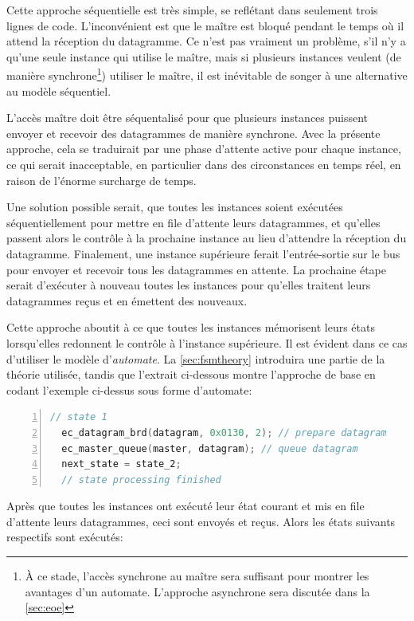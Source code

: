 \documentclass[a4paper,12pt,BCOR6mm,bibtotoc,idxtotoc]{scrbook}
\begin{document}
Cette approche s\'equentielle est tr\`es simple, se refl\'etant dans
seulement trois lignes de code.  L'inconv\'enient est que le ma\^itre
est bloqu\'e pendant le temps o\`u il attend la r\'eception du
datagramme.  Ce n'est pas vraiment un probl\`eme, s'il n'y a qu'une
seule instance qui utilise le ma\^itre, mais si plusieurs instances
veulent (de mani\`ere synchrone\footnote{ \`A ce stade, l'acc\`es
  synchrone au ma\^itre sera suffisant pour montrer les avantages
  d'un automate. L'approche asynchrone sera discut\'ee dans la
  \autoref{sec:eoe}}) utiliser le ma\^itre, il est in\'evitable de
songer \`a une alternative au mod\`ele s\'equentiel.

L'acc\`es ma\^itre doit \^etre s\'equentalis\'e pour que plusieurs
instances puissent envoyer et recevoir des datagrammes de mani\`ere
synchrone. Avec la pr\'esente approche, cela se traduirait par une
phase d'attente active pour chaque instance, ce qui serait
inacceptable, en particulier dans des circonstances en temps r\'eel,
en raison de l'\'enorme surcharge de temps.

Une solution possible serait, que toutes les instances soient
ex\'ecut\'ees s\'equentiellement pour mettre en file d'attente leurs
datagrammes, et qu'elles passent alors le contr\^ole \`a la prochaine
instance au lieu d'attendre la r\'eception du datagramme. Finalement,
une instance sup\'erieure ferait l'entr\'ee-sortie sur le bus pour
envoyer et recevoir tous les datagrammes en attente.  La prochaine
\'etape serait d'ex\'ecuter \`a nouveau toutes les instances pour
qu'elles traitent leurs datagrammes re\c{c}us et en \'emettent des
nouveaux.

Cette approche aboutit \`a ce que toutes les instances m\'emorisent
leurs \'etats lorsqu'elles redonnent le contr\^ole \`a l'instance
sup\'erieure.  Il est \'evident dans ce cas d'utiliser le mod\`ele
d'\textit{automate}.  La \autoref{sec:fsmtheory} introduira une partie
de la th\'eorie utilis\'ee, tandis que l'extrait ci-dessous montre
l'approche de base en codant l'exemple ci-dessus sous forme
d'automate:

\begin{lstlisting}[gobble=2,language=C,numbers=left]
  // state 1
  ec_datagram_brd(datagram, 0x0130, 2); // prepare datagram
  ec_master_queue(master, datagram); // queue datagram
  next_state = state_2;
  // state processing finished
\end{lstlisting}

Apr\`es que toutes les instances ont ex\'ecut\'e leur \'etat courant et mis en
file d'attente leurs datagrammes, ceci sont envoy\'es et re\c{c}us. Alors
les \'etats suivants respectifs sont ex\'ecut\'es:
\end{document}
